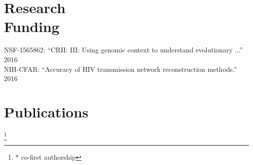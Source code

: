 \documentclass[margin,line,letterpaper]{resume}
\begin{document}
\begin{resume}
    
    
    \section{\mysidestyle Research\\Funding}
 NSF-1565862:  ``CRII: III: Using genomic context to understand evolutionary ...''
 \hfill 2016\\
 NIH-CFAR:  ``Accuracy of HIV transmission network reconstruction methods.''
 \hfill 2016
\clearpage

    \renewcommand*{\thefootnote}{\fnsymbol{footnote}}
    \section{\mysidestyle Publications}

\newcommand\blfootnote[1]{%
  \begingroup
  \renewcommand\thefootnote{}\footnote{#1}%
  \addtocounter{footnote}{-1}%
  \endgroup
}
    
\def\FormatName#1{%
  \def\myname{Siavash Mirarab}
  \def\mynamee{Siavash Mirarab)*}%
  \edef\name{#1}%
  \ifx\name\myname
    \textbf{#1}%
  \else
    \ifx\name\mynamee
       \textbf{Siavash Mirarab})*%
    \else
      #1%
    \fi
  \fi
}

\vspace{-26pt}
\blfootnote{* co-first authorship}
\begin{spacing}{1.2}

\end{spacing}

\vspace{-10pt}


\end{resume}
\end{document}
